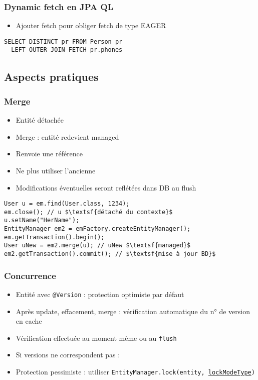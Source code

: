 \documentclass[french, english]{beamer}
\begin{document}
\begin{frame}[fragile]
	\frametitle{Dynamic fetch en JPA QL}
	\begin{itemize}
		\item Ajouter fetch pour obliger fetch de type EAGER
	\end{itemize}
	\begin{lstlisting}
SELECT DISTINCT pr FROM Person pr 
  LEFT OUTER JOIN FETCH pr.phones
	\end{lstlisting}
\end{frame}

\subsection{Aspects pratiques}
\begin{frame}[fragile]
	\frametitle{Merge}
	\begin{itemize}
		\item Entité détachée
		\item Merge : entité redevient managed
		\item Renvoie une référence
		\item Ne plus utiliser l’ancienne
		\item Modifications éventuelles seront reflétées dans DB au flush
	\end{itemize}
	\begin{lstlisting}[escapechar=$]
User u = em.find(User.class, 1234);
em.close(); // u $\textsf{détaché du contexte}$
u.setName("HerName");
EntityManager em2 = emFactory.createEntityManager();
em.getTransaction().begin();
User uNew = em2.merge(u); // uNew $\textsf{managed}$
em2.getTransaction().commit(); // $\textsf{mise à jour BD}$
	\end{lstlisting}
\end{frame}

\begin{frame}
	\frametitle{Concurrence}
	\begin{itemize}
		\item Entité avec \texttt{@Version} : protection optimiste par défaut
		\item Après update, effacement, merge : vérification automatique du n° de version en cache%
		\item Vérification effectuée au moment même ou au \texttt{flush}
		\item Si versions ne correspondent pas : 
		\item Protection pessimiste : utiliser \texttt{EntityManager.lock(entity, \href{https://docs.oracle.com/javaee/7/api/javax/persistence/LockModeType.html}{lockModeType})}
	\end{itemize}
\end{frame}
\end{document}
